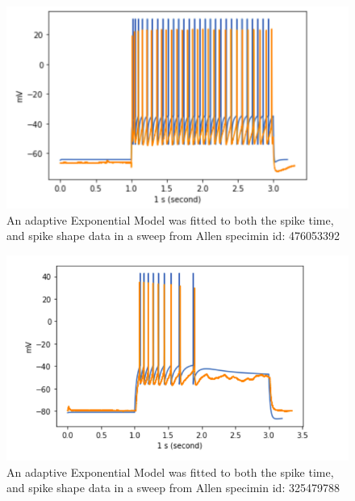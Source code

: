 \begin{figure}
    \centering
    \includegraphics[scale=0.75]{figures/28spikesB95}
    \caption{An adaptive Exponential Model was fitted to both the spike time, and spike shape data in a sweep from Allen specimin id: 476053392} \label{fig:specimen_476053392}
\end{figure}

\begin{figure}
    \centering
    \includegraphics[scale=0.75]{figures/adexp_fit_allen_specid_325479788.png}
    \caption{ An adaptive Exponential Model was fitted to both the spike time, and spike shape data in a sweep from Allen specimin id: 325479788}
    \label{fig:specimen_325479788}
\end{figure}



